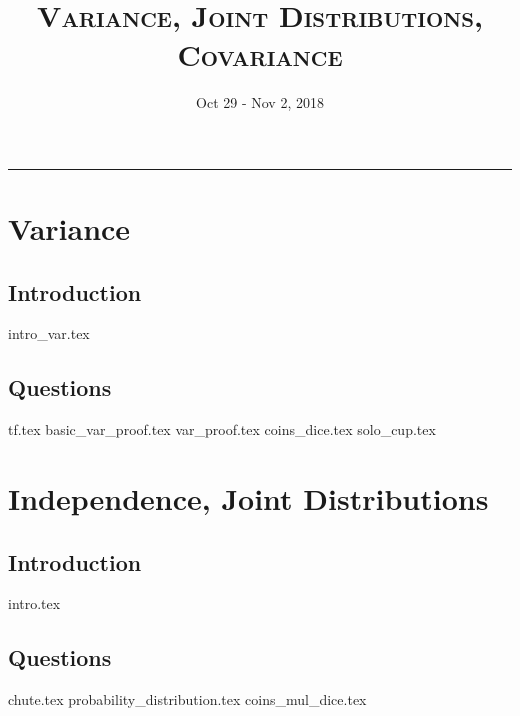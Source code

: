 \documentclass{exam}
\title{\textsc{Variance, Joint Distributions, Covariance}}
\date{Oct 29 - Nov 2, 2018}
\begin{document}
\maketitle
\rule{\textwidth}{0.15em}
\fontsize{12}{15}\selectfont
\thispagestyle{empty}


\section{Variance}
\subsection{Introduction}
{intro_var.tex}
\subsection{Questions}
\begin{questions}
{tf.tex}
{basic_var_proof.tex}
{var_proof.tex}
{coins_dice.tex}
{solo_cup.tex}
\end {questions}

\section{Independence, Joint Distributions}
\subsection{Introduction}
{intro.tex}
\subsection{Questions}
\begin{questions}
{chute.tex}
{probability_distribution.tex}
{coins_mul_dice.tex} 
\end{questions}
\end{document}

